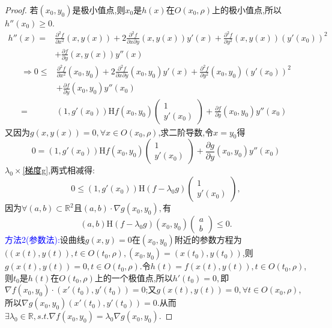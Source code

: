 \documentclass[UTF8]{ctexart}
\newcommand{\p}[2]{\frac{\partial #1}{\partial #2}}
\begin{document}
\begin{proof}
        若$(x_0,y_0)$是极小值点,则$x_0$是$h(x)$在$O(x_0,\rho)$上的极小值点,所以$h''(x_0)\ge 0$.
        \begin{align*}
            h''(x)=&\frac{\partial^2f}{\partial x^2}(x,y(x))+2\frac{\partial^2f}{\partial x\partial y}(x,y(x))y'(x)+\frac{\partial^2f}{\partial y^2}(x,y(x))(y'(x_0))^2\\
            &+\p{f}{y}(x,y(x))y''(x)
        \end{align*}
        \begin{align*}
            \Rightarrow 0\le& \frac{\partial^2f}{\partial x^2}(x_0,y_0)+2\frac{\partial^2f}{\partial x\partial y}(x_0,y_0)y'(x)+\frac{\partial^2f}{\partial y^2}(x_0,y_0)(y'(x_0))^2\\
            &+\p{f}{y}(x_0,y_0)y''(x_0)\\
            =&(1,g'(x_0))\mathrm{H}f(x_0,y_0)\begin{pmatrix}
                1\\
                y'(x_0)
            \end{pmatrix}+\p{f}{y}(x_0,y_0)y''(x_0)
        \end{align*}
        又因为$g(x,y(x))=0,\forall x\in O(x_0,\rho)$,求二阶导数,令$x=y_0$得
        \begin{equation}
            0=(1,g'(x_0))\mathrm{H}f(x_0,y_0)\begin{pmatrix}
                1\\
                y'(x_0)
            \end{pmatrix}+\p{g}{y}(x_0,y_0)y''(x_0) \label{梯度g}
        \end{equation}
        $\lambda_0\times$\eqref{梯度g},两式相减得:$$0\le (1,g'(x_0))\mathrm{H}(f-\lambda_0g)\begin{pmatrix}
            1\\
            y'(x_0)
        \end{pmatrix},$$
        因为$\forall(a,b)\subset\mathbb{R}^2$且$(a,b)\cdot\nabla g(x_0,y_0),$有$$(a,b)\mathrm{H}(f-\lambda_0g)(x_0,y_0)\begin{pmatrix}
            a\\
            b
        \end{pmatrix}\le 0.$$
        \textcolor{blue}{方法2(参数法):}设曲线$g(x,y)=0$在$(x_0,y_0)$附近的参数方程为$((x(t),y(t)),t\in O(t_0,\rho),(x_0,y_0)=(x(t_0),y(t_0))$,则$g(x(t),y(t))=0,t\in O(t_0,\rho)$.令$h(t)=f(x(t),y(t)),t\in O(t_0,\rho)$,则$t_0$是$h(t)$在$O(t_0,\rho)$上的一个极值点,所以$h'(t_0)=0,$即$\nabla f(x_0,y_0)\cdot(x'(t_0),y'(t_0))=0$;又$g(x(t),y(t))=0,\forall t\in O(x_0,\rho)$,所以$\nabla g(x_0,y_0)(x'(t_0),y'(t_0))=0$.从而$\exists\lambda_0\in\mathbb{R},s.t.\nabla f(x_0,y_0)=\lambda_0\nabla g(x_0,y_0)$.


\end{proof}
\end{document}
